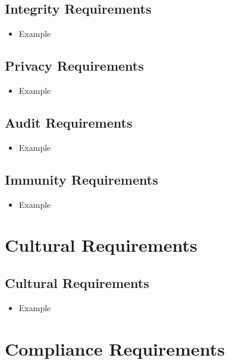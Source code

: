 \documentclass[12pt]{article}
\begin{document}
  \subsection{Integrity Requirements}
    \begin{itemize}
      \item Example
    \end{itemize}

  \subsection{Privacy Requirements}
    \begin{itemize}
      \item Example
    \end{itemize}

  \subsection{Audit Requirements}
    \begin{itemize}
      \item Example
    \end{itemize}

  \subsection{Immunity Requirements}
    \begin{itemize}
      \item Example
    \end{itemize}

\section{Cultural Requirements}
  \subsection{Cultural Requirements}
    \begin{itemize}
      \item Example
    \end{itemize}

\section{Compliance Requirements}
\end{document}
